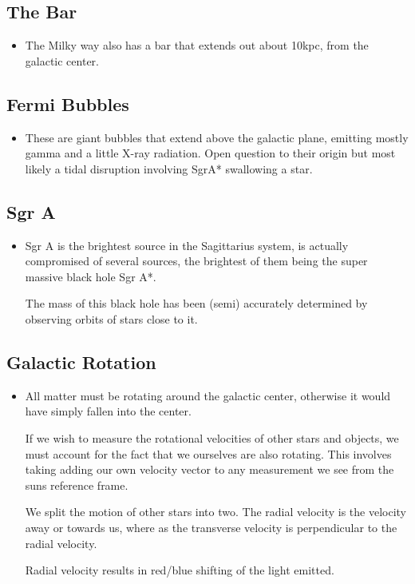 \documentclass[11pt]{article}
\numberwithin{equation}{section}
\begin{document}
\subsection{The Bar} 
\begin{itemize}
    \item The Milky way also has a bar that extends out about 10kpc, from the galactic center.  
\end{itemize}
\subsection{Fermi Bubbles }
\begin{itemize}
    \item These are giant bubbles that extend above the galactic plane, emitting mostly gamma and a little X-ray radiation.  Open question to their origin but most likely a tidal disruption involving SgrA* swallowing a star. 
\end{itemize}

\subsection{Sgr A}
\begin{itemize}
    \item Sgr A is the brightest source in the Sagittarius system, is actually compromised of several sources, the brightest of them being the super massive black hole Sgr A*.

The mass of this black hole has been (semi) accurately determined by observing orbits of stars close to it. 
\end{itemize}

\subsection{Galactic Rotation}
\begin{itemize}
    \item All matter must be rotating around the galactic center, otherwise it would have simply fallen into the center. 

If we wish to measure the rotational velocities of other stars and objects, we must account for the fact that we ourselves are also rotating. This involves taking adding our own velocity vector to any measurement we see from the suns reference frame. 

We split the motion of other stars into two. The radial velocity is the velocity away or towards us, where as the transverse velocity is perpendicular to the radial velocity. 

Radial velocity results in red/blue shifting of the light emitted. 
\end{itemize}
\end{document}
